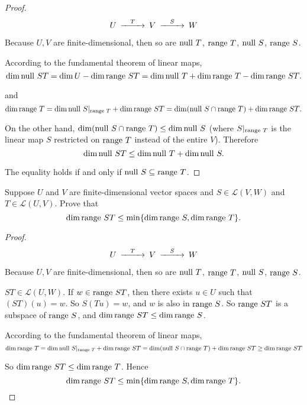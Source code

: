 \begin{proof}
    \[
        \begin{CD}
            U @>T>>     V @>S>>     W
        \end{CD}
    \]

    Because $U, V$ are finite-dimensional, then so are $\operatorname{null}\,{T}$, $\operatorname{range}\,{T}$, $\operatorname{null}\,{S}$, $\operatorname{range}\,{S}$.

    According to the fundamental theorem of linear maps,
    \[
        \dim\operatorname{null}\,{ST} = \dim U - \dim\operatorname{range}\,{ST} = \dim \operatorname{null}\,{T} + \dim\operatorname{range}\,{T} - \dim\operatorname{range}\,{ST}.
    \]

    and
    \[
        \dim\operatorname{range}\,{T} = \dim \operatorname{null}\,{S\vert_{\operatorname{range}\,{T}}} + \dim\operatorname{range}\,{ST} = \dim (\operatorname{null}\,{S}\cap\operatorname{range}\,{T}) + \dim\operatorname{range}\,{ST}.
    \]

    On the other hand, $\dim (\operatorname{null}\,{S}\cap\operatorname{range}\,{T}) \leq \dim\operatorname{null}\,{S}$ (where $S\vert_{\operatorname{range}\,{T}}$ is the linear map $S$ restricted on $\operatorname{range}\,{T}$ instead of the entire $V$). Therefore
    \[
        \dim\operatorname{null}\,{ST} \leq \dim\operatorname{null}\,{T} + \dim\operatorname{null}\,{S}.
    \]

    The equality holds if and only if $\operatorname{null}\,{S}\subseteq \operatorname{range}\,{T}$.
\end{proof}
\newpage

\begin{exercise}
    Suppose $U$ and $V$ are finite-dimensional vector spaces and $S \in \mathcal{L}(V, W)$ and $T \in \mathcal{L}(U, V)$. Prove that
    \[
        \dim\operatorname{range}\,{ST} \leq \min\{\dim\operatorname{range}\,{S}, \dim\operatorname{range}\,{T}\}.
    \]
\end{exercise}

\begin{proof}
    \[
        \begin{CD}
            U @>T>>     V @>S>>     W
        \end{CD}
    \]

    Because $U, V$ are finite-dimensional, then so are $\operatorname{null}\,{T}$, $\operatorname{range}\,{T}$, $\operatorname{null}\,{S}$, $\operatorname{range}\,{S}$.

    $ST\in\mathcal{L}(U, W)$. If $w\in\operatorname{range}\,{ST}$, then there exists $u\in U$ such that $(ST)(u) = w$. So $S(Tu) = w$, and $w$ is also in $\operatorname{range}\,{S}$. So $\operatorname{range}\,{ST}$ is a subspace of $\operatorname{range}\,{S}$, and $\dim\operatorname{range}\,{ST}\leq \dim\operatorname{range}\,{S}$.

    According to the fundamental theorem of linear maps,
    \[
        \dim\operatorname{range}\,{T} = \dim \operatorname{null}\,{S\vert_{\operatorname{range}\,{T}}} + \dim\operatorname{range}\,{ST} = \dim (\operatorname{null}\,{S}\cap\operatorname{range}\,{T}) + \dim\operatorname{range}\,{ST} \geq \dim\operatorname{range}\,{ST}
    \]

    So $\dim\operatorname{range}\,{ST}\leq \dim\operatorname{range}\,{T}$. Hence
    \[
        \dim\operatorname{range}\,{ST}\leq \min\{ \dim\operatorname{range}\,{S}, \dim\operatorname{range}\,{T} \}.\qedhere
    \]
\end{proof}
\newpage

